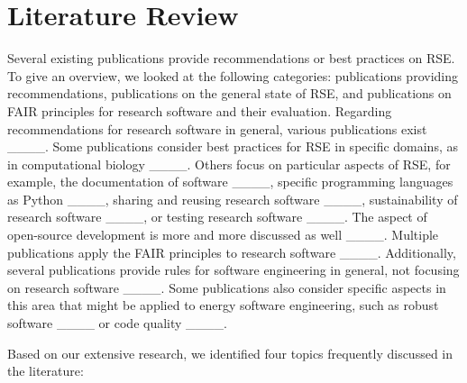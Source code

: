 \section{Literature Review}
\label{subsec:rel_work}
Several existing publications provide recommendations or best practices on \ac{RSE}. To give an overview, we looked at the following categories: publications providing recommendations, publications on the general state of \ac{RSE}, and publications on \ac{FAIR} principles for research software and their evaluation.
Regarding recommendations for research software in general, various publications exist ____. Some publications consider best practices for \ac{RSE} in specific domains, as in computational biology ____. Others focus on particular aspects of \ac{RSE}, for example, the documentation of software ____, specific programming languages as Python ____, sharing and reusing research software ____, sustainability of research software ____, or testing research software ____.
The aspect of open-source development is more and more discussed as well ____. 
Multiple publications apply the \ac{FAIR} principles to research software ____.
Additionally, several publications provide rules for software engineering in general, not focusing on research software ____. Some publications also consider specific aspects in this area that might be applied to energy software engineering, such as robust software ____ or code quality ____. 
\par 
Based on our extensive research, we identified four topics frequently discussed in the literature:

